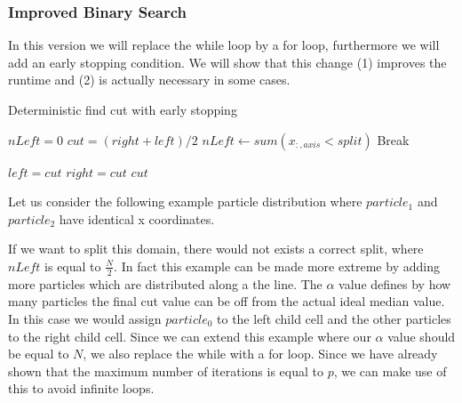 \documentclass[]{article}
\begin{document}
\subsubsection{Improved Binary Search}

In this version we will replace the while loop by a for loop, furthermore we will add an early stopping condition. We will show that this change (1) improves the runtime and (2) is actually necessary in some cases.

\begin{algorithm}[H]
	\caption{Deterministic find cut with early stopping}\label{algo:cut}
	\begin{algorithmic}[1]
		\State $nLeft = 0$
		\newline
		\State $cut = (right + left ) / 2 $
		\State $nLeft\gets sum(x_{:,axis} < split)$
		\newline
		\State Break
		\EndIf
		\newline

		\State $left = cut$
		\Else 
		\State $right = cut$
		\EndIf
		\newline
		\EndFor
		\State \Return $cut$
		\EndProcedure
	\end{algorithmic}
\end{algorithm}

Let us consider the following example particle distribution where $particle_1$ and $particle_2$ have identical x coordinates. 

\begin{figure}[H]
	\begin{center}
	\end{center}
\end{figure}

If we want to split this domain, there would not exists a correct split, where $nLeft$ is equal to $\frac{N}{2}$. In fact this example can be made more extreme by adding more particles which are distributed along a the line.
The $\alpha$ value defines by how many particles the final cut value can be off from the actual ideal median value. In this case we would assign $particle_0$ to the left child cell and the other particles to the right child cell. Since we can extend this example where our $\alpha$ value should be equal to $N$, we also replace the while with a for loop. Since we have already shown that the maximum number of iterations is equal to $p$, we can make use of this to avoid infinite loops. 
\end{document}
